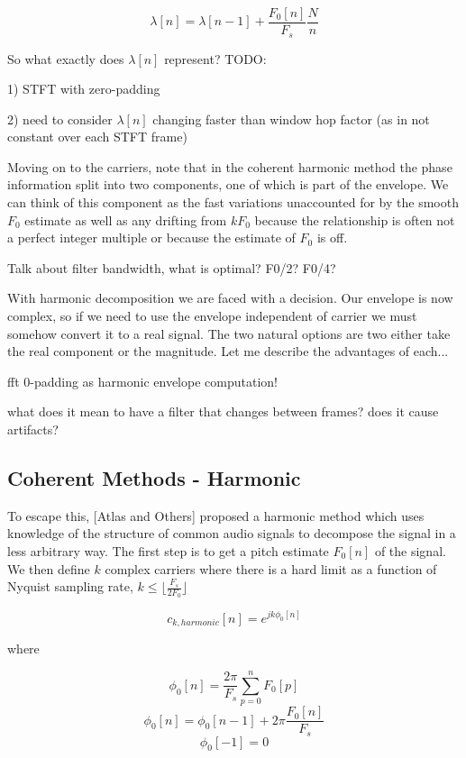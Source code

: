 \documentclass [11pt, proquest] {uwthesis}[2015/03/03]
\begin{document}
$$\lambda[n] = \lambda[n-1] + \frac{F_0[n]}{F_s}  \frac{N}{n}$$

So what exactly does $\lambda[n]$ represent?  TODO: 

1) STFT with zero-padding

2) need to consider $\lambda[n]$ changing faster than window hop factor (as in not constant over each STFT frame)

Moving on to the carriers, note that in the coherent harmonic method the phase information split into two components, one of which is part of the envelope.  We can think of this component as the fast variations unaccounted for by the smooth $F_0$ estimate as well as any drifting from $kF_0$ because the relationship is often not a perfect integer multiple or because the estimate of $F_0$ is off.


Talk about filter bandwidth, what is optimal? F0/2? F0/4?


With harmonic decomposition we are faced with a decision.  Our envelope is now complex, so if we need to use the envelope independent of carrier we must somehow convert it to a real signal.  The two natural options are two either take the real component or the magnitude.  Let me describe the advantages of each...


fft 0-padding as harmonic envelope computation!

		what does it mean to have a filter that changes
		between frames?  does it cause artifacts?






\subsection{Coherent Methods - Harmonic}

To escape this, [Atlas and Others] proposed a harmonic method which uses knowledge of the structure of common audio signals to decompose the signal in a less arbitrary way.  The first step is to get a pitch estimate $F_0[n]$ of the signal.  We then define $k$ complex carriers where there is a hard limit as a function of Nyquist sampling rate, $k \leq  \lfloor \frac{F_s}{2F_0} \rfloor$

$$c_{k,harmonic}[n] = e^{jk\phi_0 [n]}$$

where 

$$\phi_0[n] = \frac{2\pi}{F_s} \sum_{p=0}^{n} F_0[p]$$
$$\phi_0[n] = \phi_0[n - 1] + 2\pi \frac{F_0[n]}{F_s}$$
$$\phi_0[-1] = 0$$
\end{document}

